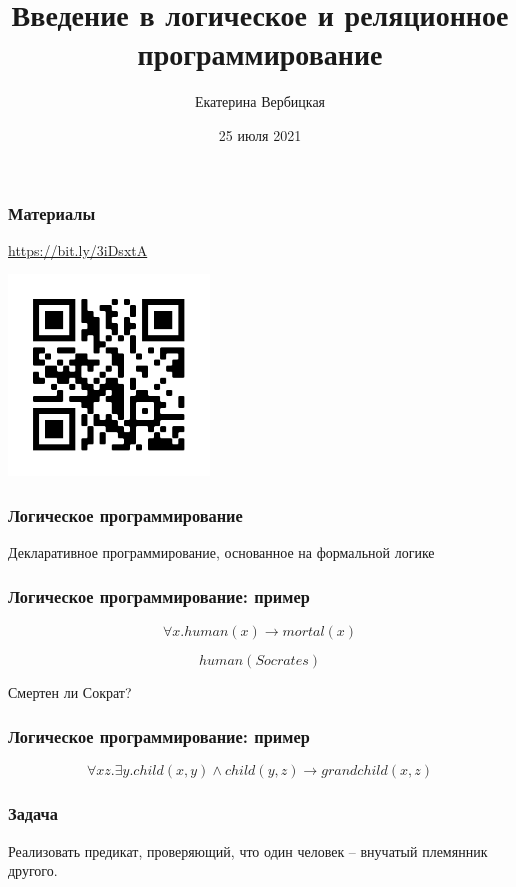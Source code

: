 \documentclass{beamer}
\title[]{Введение в логическое и реляционное программирование}
\subtitle[]{}
\institute[]{
Лаборатория языков инструментов JetBrains\\
}
\author[]{Екатерина Вербицкая}
\date{25 июля 2021}
\begin{document}
{
  \begin{frame}
    \titlepage
  \end{frame}
}

\begin{frame}[fragile]
  \frametitle{Материалы}
\begin{center}
\url{https://bit.ly/3iDsxtA}

\vspace{1cm}

\includegraphics[width=0.4\textwidth]{pics/links.png}
\end{center}
\end{frame}


\begin{frame}[fragile]
  \frametitle{Логическое программирование}
\begin{center}
  Декларативное программирование, основанное на формальной логике
\end{center}
\end{frame}

\begin{frame}[fragile]
  \frametitle{Логическое программирование: пример}
\[
  \forall x. human(x) \to mortal(x)
\]

\[
  human(Socrates)
\]

\vspace{1cm}

\begin{center}
  Смертен ли Сократ?
\end{center}
\end{frame}

\begin{frame}[fragile]
  \frametitle{Логическое программирование: пример}
\[
  \forall x z. \exists y. child (x,y) \wedge child(y,z) \to grandchild(x,z)
\]
\end{frame}

\begin{frame}[fragile]
  \frametitle{Задача}
Реализовать предикат, проверяющий, что один человек -- внучатый племянник другого.
\end{frame}
\end{document}
